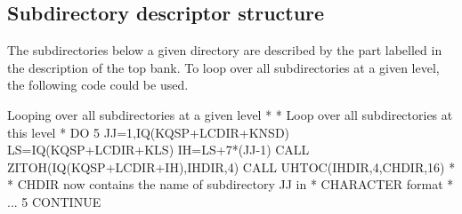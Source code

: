 \subsection*{Subdirectory descriptor structure}
The subdirectories below a given directory are described
by the part labelled  in the description of the top bank.
To loop over all subdirectories at a given level, the following code
could be used.
\begin{XMPt}{Looping over all subdirectories at a given level}
*
*     Loop over all subdirectories at this level
*
         DO 5 JJ=1,IQ(KQSP+LCDIR+KNSD)
            LS=IQ(KQSP+LCDIR+KLS)
            IH=LS+7*(JJ-1)
            CALL ZITOH(IQ(KQSP+LCDIR+IH),IHDIR,4)
            CALL UHTOC(IHDIR,4,CHDIR,16)
*
*     CHDIR now contains the name of subdirectory JJ in
*     CHARACTER format
*
...
   5        CONTINUE
\end{XMPt}
